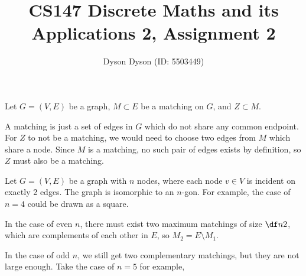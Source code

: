 \documentclass[a4paper]{article}
\title{CS147 Discrete Maths and its Applications 2, Assignment 2}
\author{Dyson Dyson (ID: 5503449)}
\date{}
\begin{document}
\maketitle

\setlength{\parindent}{0em}
\setlength{\parskip}{1em}

\pagestyle{fancy}


Let $G = (V, E)$ be a graph, $M \subset E$ be a matching on $G$, and $Z \subset M$.

A matching is just a set of edges in $G$ which do not share any common endpoint. For $Z$ to not be a matching, we would need to choose two edges from $M$ which share a node. Since $M$ is a matching, no such pair of edges exists by definition, so $Z$ must also be a matching.


\newpage
{}

Let $G = (V, E)$ be a graph with $n$ nodes, where each node $v \in V$ is incident on exactly 2 edges.
The graph is isomorphic to an $n$-gon. For example, the case of $n=4$ could be drawn as a square.

In the case of even $n$, there must exist two maximum matchings of size $\df n2$, which are complements of each other in $E$, so $M_2 = E \setminus M_1$.

In the case of odd $n$, we still get two complementary matchings, but they are not large enough. Take the case of $n=5$ for example,

\begin{center}
\end{center}
\end{document}
